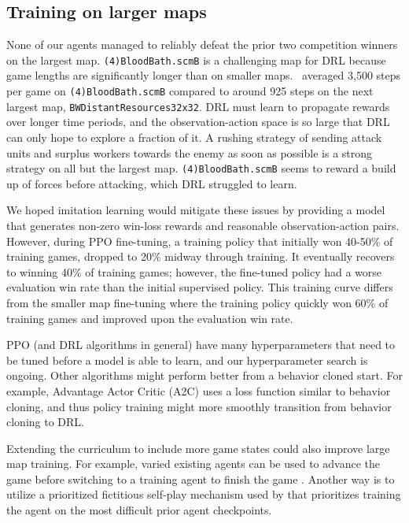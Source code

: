 \documentclass[conference]{IEEEtran}
\begin{document}
\subsection{Training on larger maps}
None of our agents managed to reliably defeat the prior two competition winners on 
the largest map. \texttt{(4)BloodBath.scmB} is a challenging map for DRL because game 
lengths are significantly longer than on smaller
maps. \bcPPOAgent\ averaged 3,500 steps per game on
\texttt{(4)BloodBath.scmB} compared to around 925 steps on the next largest map,
\texttt{BWDistantResources32x32}. DRL must learn to propagate rewards over longer time
periods, and the observation-action space is so large that DRL can only hope to explore a
fraction of it. A rushing strategy of sending attack units and surplus workers towards
the enemy as soon as possible is a strong strategy on all but the largest map.
\texttt{(4)BloodBath.scmB} seems to reward a build up of forces before attacking, which
DRL struggled to learn.

We hoped imitation learning would mitigate these issues by providing a model that
generates non-zero win-loss rewards and reasonable observation-action pairs.
However, during PPO fine-tuning, a training policy that initially won 40-50\% of
training games, dropped to 20\% midway through training. It eventually recovers to
winning 40\% of training games; however, the fine-tuned policy had a worse evaluation
win rate than the initial supervised policy. This training curve differs from the
smaller map fine-tuning where the training policy quickly won 60\% of
training games and improved upon the evaluation win rate.

PPO (and DRL algorithms in general) have many hyperparameters that need to be tuned
before a model is able to learn, and our hyperparameter search is ongoing. Other 
algorithms might perform better from a behavior cloned start. For example,
Advantage Actor Critic (A2C) \cite{DBLP:conf/icml/MnihBMGLHSK16} uses a loss
function similar to behavior cloning, and thus policy training might more smoothly
transition from behavior cloning to DRL.

Extending the curriculum to include more game states could also improve large map
training. For example, varied existing agents can be used to advance the game before
switching to a training agent to finish the game \cite{DBLP:conf/icml/UchenduX0ZYSBFM23}.
Another way is to utilize a prioritized fictitious self-play mechanism used by
\cite{Vinyals2019GrandmasterLI} that prioritizes training the agent on the
most difficult prior agent checkpoints.
\end{document}
